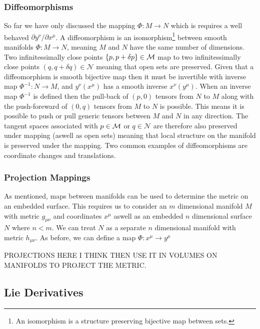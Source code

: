 \subsubsection{Diffeomorphisms}
So far we have only discussed the mapping $\Phi :M \rightarrow N$ which is requires a well behaved $\partial y^\nu / \partial x^\mu$. A diffeomorphism is an isomorphism\footnote{An isomorphism is a structure preserving bijective map between sets.} between smooth manifolds $\Phi :M \rightarrow N$, meaning $M$ and $N$ have the same number of dimensions. Two infinitessimally close points $\{p,p+\delta p\}\in\mathcal{M}$ map to two infinitessimally close points $(q,q+\delta q)\in\mathcal{N}$ meaning that open sets are preserved. Given that a diffeomorphism is smooth bijective map then it must be invertible with inverse map $\Phi^{-1}:N \rightarrow M$, and $y^\nu(x^\mu)$ has a smooth inverse $x^\nu(y^\mu)$. When an inverse map $\Phi^{-1}$ is defined then the pull-back of $(p,0)$ tensors from $N$ to $M$ along with the push-foreward of $(0,q)$ tensors from $M$ to $N$ is possible. This means it is possible to push or pull generic tensors between $M$ and $N$ in any direction. The tangent spaces associated with $p \in \mathcal{M}$ or $q \in \mathcal{N}$ are therefore also preserved under mapping (aswell as open sets) meaning that local structure on the manifold is preserved under the mapping. Two common examples of diffeomorphisms are coordinate changes and translations.


\subsubsection{Projection Mappings}
As mentioned, maps between manifolds can be used to determine the metric on an embedded surface. This requires us to consider an $m$ dimensional manifold $M$ with metric $g_{\mu\nu}$ and coordinates $x^\mu$ aswell as an embedded $n$ dimensional surface $N$ where $n<m$. We can treat $N$ as a separate $n$ dimensional manifold with metric $h_{\mu\nu}$. As before, we can define a map $\Phi:x^\mu \rightarrow y^\mu$


PROJECTIONS HERE I THINK THEN USE IT IN VOLUMES ON MANIFOLDS TO PROJECT THE METRIC.




\subsection{Lie Derivatives}\label{intro:sec:lie_deriv}

